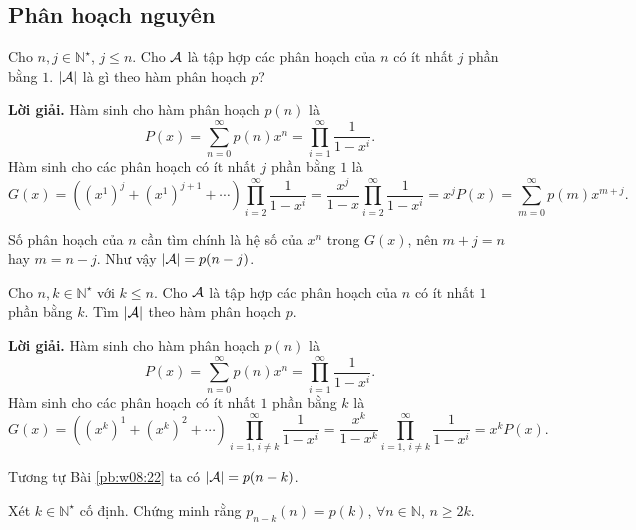 \subsection{Phân hoạch nguyên}
\begin{tcolorbox}[breakable]
    \begin{baitoan}\label{pb:w08:22}
        Cho $n,j\in\mathbb{N}^\star$, $j\le n$. Cho ${\cal A}$ là tập hợp các phân hoạch của $n$ có ít nhất $j$ phần bằng $1$. $|{\cal A}|$ là gì theo hàm phân hoạch $p$?
    \end{baitoan}
\end{tcolorbox}

\textbf{Lời giải. }Hàm sinh cho hàm phân hoạch $p(n)$ là $$P(x) = \sum\limits_{n=0}^\infty p(n) x^n = \prod\limits_{i=1}^\infty \dfrac{1}{1-x^i}.$$ Hàm sinh cho các phân hoạch có ít nhất $j$ phần bằng $1$ là $$G(x) = \left((x^1)^j + (x^1)^{j+1}+\cdots\right)\prod\limits_{i=2}^\infty \dfrac{1}{1-x^i} = \dfrac{x^j}{1-x}\prod\limits_{i=2}^\infty \dfrac{1}{1-x^i} = x^jP(x) = \sum\limits_{m=0}^\infty p(m)x^{m+j}.$$

Số phân hoạch của $n$ cần tìm chính là hệ số của $x^n$ trong $G(x)$, nên $m+j = n$ hay $m = n-j$. Như vậy $|{\cal A}| = p(n-j)$.

\begin{tcolorbox}[breakable]
    \begin{baitoan}\label{pb:w08:23}
        Cho $n,k\in\mathbb{N}^\star$ với $k\le n$. Cho ${\cal A}$ là tập hợp các phân hoạch của $n$ có ít nhất $1$ phần bằng $k$. Tìm $|{\cal A}|$ theo hàm phân hoạch $p$.
    \end{baitoan}
\end{tcolorbox}

\textbf{Lời giải. }Hàm sinh cho hàm phân hoạch $p(n)$ là $$P(x) = \sum\limits_{n=0}^\infty p(n) x^n = \prod\limits_{i=1}^\infty \dfrac{1}{1-x^i}.$$ Hàm sinh cho các phân hoạch có ít nhất $1$ phần bằng $k$ là $$G(x) = \left((x^k)^1 + (x^k)^{2}+\cdots\right)\prod\limits_{i=1,\,i\ne k}^\infty \dfrac{1}{1-x^i} = \dfrac{x^k}{1-x^k}\prod\limits_{i=1,\,i\ne k}^\infty \dfrac{1}{1-x^i} = x^kP(x).$$

Tương tự Bài \ref{pb:w08:22} ta có $|{\cal A}| = p(n-k)$.

\begin{tcolorbox}[breakable]
    \begin{baitoan}\label{pb:w08:24}
        Xét $k\in\mathbb{N}^\star$ cố định. Chứng minh rằng $p_{n - k}(n) = p(k)$, $\forall n\in\mathbb{N}$, $n\ge2k$.
    \end{baitoan}
\end{tcolorbox}

